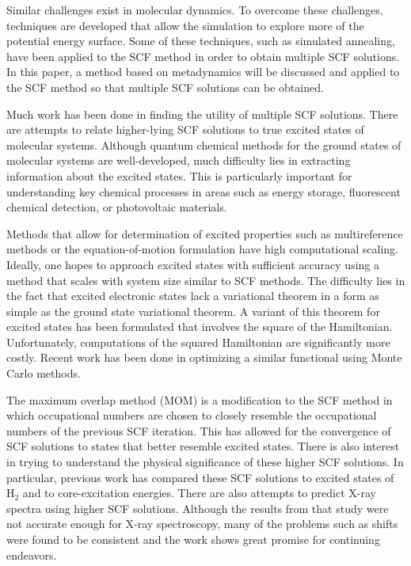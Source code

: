 \documentclass[final,3p,times,twocolumn]{elsarticle}
\begin{document}
Similar challenges exist in molecular dynamics. To overcome these challenges, techniques are developed that allow the simulation to explore more of the potential energy surface. Some of these techniques, such as simulated annealing, have been applied to the SCF method in order to obtain multiple SCF solutions.\cite{malbouisson-2005} In this paper, a method based on metadynamics\cite{parrinello-2002} will be discussed and applied\cite{scfmd} to the SCF method so that multiple SCF solutions can be obtained.

Much work has been done in finding the utility of multiple SCF solutions. There are attempts to relate higher-lying SCF solutions to true excited states of molecular systems. Although quantum chemical methods for the ground states of molecular systems are well-developed, much difficulty lies in extracting information about the excited states. This is particularly important for understanding key chemical processes in areas such as energy storage,\cite{es-ex1,es-ex2} fluorescent chemical detection,\cite{es-ex3} or photovoltaic materials.\cite{es-ex4,es-ex5}

Methods that allow for determination of excited properties such as multireference methods\cite{shavitt} or the equation-of-motion formulation\cite{eomcc} have high computational scaling. Ideally, one hopes to approach excited states with sufficient accuracy using a method that scales with system size similar to SCF methods. The difficulty lies in the fact that excited electronic states lack a variational theorem in a form as simple as the ground state variational theorem. A variant of this theorem for excited states has been formulated that involves the square of the Hamiltonian.\cite{messmer-1969,brett-1972,murakhtanov-1982} Unfortunately, computations of the squared Hamiltonian are significantly more costly. Recent work has been done in optimizing a similar functional using Monte Carlo methods.\cite{zhao-2016-1,zhao-2016-2}

The maximum overlap method (MOM) is a modification to the SCF method in which occupational numbers are chosen to closely resemble the occupational numbers of the previous SCF iteration.\cite{mom} This has allowed for the convergence of SCF solutions to states that better resemble excited states. There is also interest in trying to understand the physical significance of these higher SCF solutions. In particular, previous work has compared these SCF solutions to excited states of H$_2$\cite{gill-2014} and to core-excitation energies.\cite{gill-2009} There are also attempts to predict X-ray spectra using higher SCF solutions.\cite{besley-2013} Although the results from that study were not accurate enough for X-ray spectroscopy, many of the problems such as shifts were found to be consistent and the work shows great promise for continuing endeavors. 
\end{document}
